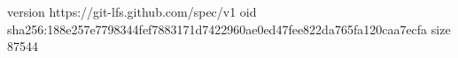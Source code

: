 version https://git-lfs.github.com/spec/v1
oid sha256:188e257e7798344fef7883171d7422960ae0ed47fee822da765fa120caa7ecfa
size 87544
